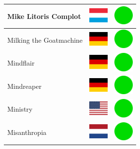 \documentclass[12pt, a4paper, twoside]{report}
\begin{document}
\begin{center}
\begin{longtable}{|p{5cm}|p{2cm}|p{2cm}|}
Mike Litoris Complot & \includegraphics[width=1cm]{4x3/lu} & \includegraphics[width=1cm]{likes/y} \\ \hline
Milking the Goatmachine & \includegraphics[width=1cm]{4x3/de} & \includegraphics[width=1cm]{likes/y} \\ \hline
Mindflair & \includegraphics[width=1cm]{4x3/de} & \includegraphics[width=1cm]{likes/y} \\ \hline
Mindreaper & \includegraphics[width=1cm]{4x3/de} & \includegraphics[width=1cm]{likes/y} \\ \hline
Ministry & \includegraphics[width=1cm]{4x3/us} & \includegraphics[width=1cm]{likes/y} \\ \hline
Misanthropia & \includegraphics[width=1cm]{4x3/nl} & \includegraphics[width=1cm]{likes/y} \\ \hline

\end{longtable}
\end{center}
\end{document}
